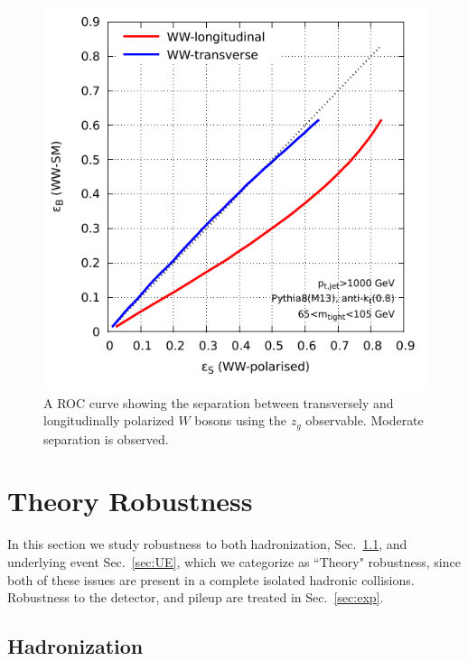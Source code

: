 \documentclass[11pt,letterpaper]{article}
\DeclareRobustCommand{\Sec}[1]{Sec.~\ref{#1}}
\begin{document}
\begin{figure}
\begin{center}
\includegraphics[width=0.45\columnwidth]{figures/polarisation-zg-roc}
\end{center}
\caption{A ROC curve showing the separation between transversely and longitudinally polarized $W$ bosons using the $z_g$ observable. Moderate separation is observed.}
\label{fig:z_g_ROC}
\end{figure}



\section{Theory Robustness}\label{sec:np}


In this section we study robustness to both hadronization, \Sec{sec:hadr}, and underlying event \Sec{sec:UE}, which we categorize as ``Theory" robustness, since both of these issues are present in a complete isolated hadronic collisions. Robustness to the detector, and pileup are treated in \Sec{sec:exp}. 



\subsection{Hadronization}\label{sec:hadr}
\end{document}
